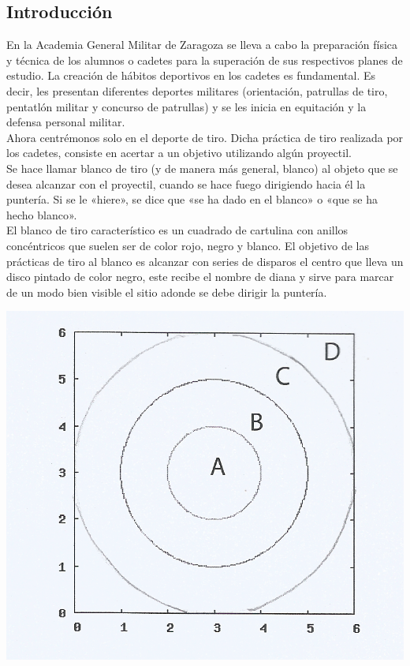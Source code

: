 \documentclass[12pt,a4paper]{article}
\begin{document}
\begin{multicols}{2}
	\section{Introducción}
	
	\noindent En la Academia General Militar de Zaragoza se lleva a cabo la preparación física y técnica de los alumnos o cadetes para la superación de sus respectivos planes de estudio. La creación de hábitos deportivos en los cadetes es fundamental. Es decir, les presentan diferentes deportes militares (orientación, patrullas de tiro, pentatlón militar y concurso de patrullas) y se les inicia en equitación y la defensa personal militar.\\
	\noindent Ahora centrémonos solo en el deporte de tiro. Dicha práctica de tiro realizada por los cadetes, consiste en acertar a un objetivo utilizando algún proyectil.\\ Se hace llamar blanco de tiro (y de manera más general, blanco) al objeto que se desea alcanzar con el proyectil, cuando se hace fuego dirigiendo hacia él la puntería. Si se le «hiere», se dice que «se ha dado en el blanco» o «que se ha hecho blanco». \\
	\noindent El blanco de tiro característico es un cuadrado de cartulina con anillos concéntricos que suelen ser de color rojo, negro y blanco. El objetivo de las prácticas de tiro al blanco es alcanzar con series de disparos el  centro que lleva un disco pintado de color negro, este recibe el nombre de diana y sirve para marcar de un modo bien visible el sitio adonde se debe dirigir la puntería.
	\begin{center}
		\includegraphics[scale=0.25]{diana.png}\\

\end{center}
\end{multicols}
\end{document}
